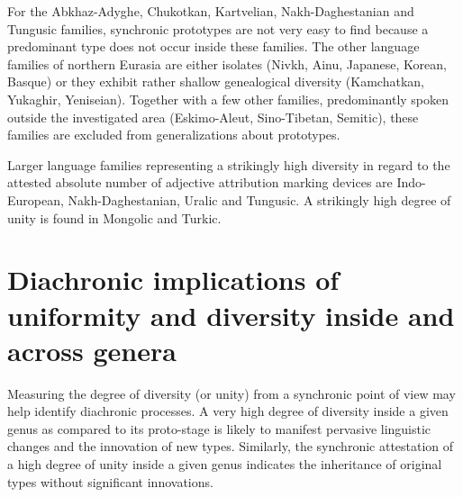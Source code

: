 For the Abkhaz-Adyghe, Chukotkan, Kartvelian, Nakh-Daghestanian and Tungusic families, synchronic prototypes are not very easy to find because a predominant type does not occur inside these families. The other language families of northern Eurasia are either isolates (Nivkh, Ainu, Japanese, Korean, Basque) or they exhibit rather shallow genealogical diversity (Kamchatkan, Yukaghir, Yeniseian). Together with a few other families, predominantly spoken outside the investigated area (Eskimo-Aleut, Sino-Tibetan, Semitic), these families are excluded from generalizations about prototypes. 

Larger language families representing a strikingly high diversity in regard to the attested absolute number of adjective attribution marking devices are Indo-European, Nakh-Daghestanian, Uralic and Tungusic. A strikingly high degree of unity is found in Mongolic and Turkic.

\section[Diachronic implications]{Diachronic implications of uniformity and diversity inside and across genera}
Measuring the degree of diversity (or unity) from a synchronic point of view may help identify diachronic processes. A very high degree of diversity inside a given genus as compared to its proto-stage is likely to manifest pervasive linguistic changes and the innovation of new types. Similarly, the synchronic attestation of a high degree of unity inside a given genus indicates the inheritance of original types without significant innovations. 

